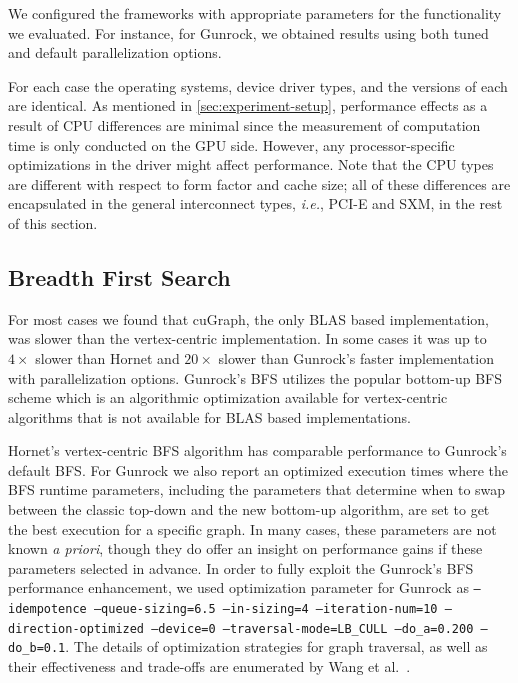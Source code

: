 We configured the frameworks with appropriate parameters for the functionality we evaluated. For instance, for Gunrock, we obtained results using both tuned and default parallelization options.

For each case the operating systems, device driver types, and the versions of each are identical. As mentioned in \ref{sec:experiment-setup}, performance effects as a result of CPU differences are minimal since the measurement of computation time is only conducted on the GPU side. However, any processor-specific optimizations in the driver might affect performance. Note that the CPU types are different with respect to form factor and cache size; all of these differences are encapsulated in the general interconnect types, \emph{i.e.}, PCI-E and SXM, in the rest of this section.

 \subsection{Breadth First Search}
For most cases we found that cuGraph, the only BLAS based implementation, was slower than the vertex-centric implementation. In some cases it was up to $4 \times$ slower than Hornet and $20\times$ slower than Gunrock's faster implementation with parallelization options. Gunrock's BFS utilizes the popular bottom-up BFS scheme which is an algorithmic optimization available for vertex-centric algorithms that is not available for BLAS based implementations.

Hornet's vertex-centric BFS algorithm has comparable performance to Gunrock's default BFS\@. For Gunrock we also report an optimized execution times where the BFS runtime parameters, including the parameters that determine when to swap between the classic top-down and the new bottom-up algorithm, are set to get the best execution for a specific graph. In many cases, these parameters are not known \emph{a priori}, though they do offer an insight on performance gains
if these parameters %
selected in advance. In order to fully exploit the Gunrock's BFS performance enhancement, we used optimization parameter for Gunrock as \texttt{--idempotence --queue-sizing=6.5 --in-sizing=4 --iteration-num=10 --direction-optimized --device=0 --traversal-mode=LB\_CULL --do\_a=0.200 --do\_b=0.1}. The details of optimization strategies for graph traversal, as well as their effectiveness and trade-offs are enumerated by Wang et al.~\cite{wang2017gunrock}.

